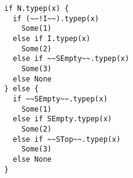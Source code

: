 \begin{lstlisting}[style=reclojureScala]
if N.typep(x) {
  if (~~!I~~).typep(x)
    Some(1)
  else if I.typep(x)
    Some(2)
  else if ~~SEmpty~~.typep(x)
    Some(3)
  else None
} else {
  if ~~SEmpty~~.typep(x)
    Some(1)
  else if SEmpty.typep(x)
    Some(2)
  else if ~~STop~~.typep(x)
    Some(3)
  else None
}
\end{lstlisting}
